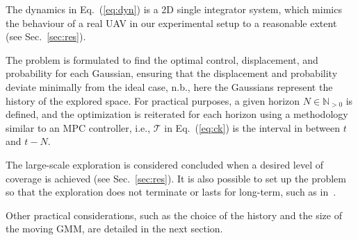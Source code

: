 \documentclass[letterpaper,10pt,conference,twoside]{IEEEtran}
\theoremstyle{definition}
\begin{document}
The dynamics in Eq.~(\ref{eq:dyn}) is a 2D single integrator system, which mimics the behaviour of a real UAV in our experimental setup to a reasonable extent (see Sec.~\ref{sec:res}).

The problem is formulated to find the optimal control, displacement, and probability for each Gaussian, ensuring that the displacement and probability deviate minimally from the ideal case, n.b., here the Gaussians represent the history of the explored space. For practical purposes, a given horizon $N \in \mathbb{N}_{>0}$ is defined, and the optimization is reiterated for each horizon using a methodology similar to an MPC controller, i.e., $\mathcal{T}$ in Eq.~(\ref{eq:ck}) is the interval in between $t$ and $t-N$.

The large-scale exploration is considered concluded when a desired level of coverage is achieved (see Sec.~\ref{sec:res}). It is also possible to set up the problem so that the exploration does not terminate or lasts for long-term, such as in~\cite{seewald2022energy}.

Other practical considerations, such as the choice of the history and the size of the moving GMM, are detailed in the next section.
\end{document}
